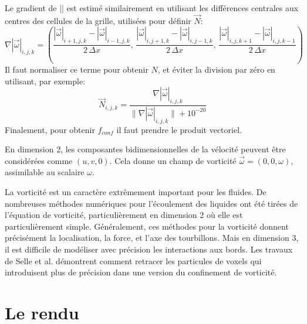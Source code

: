 \documentclass[11pt]{article}
\begin{document}
Le gradient de |\overrightarrow{\omega}| est estimé similairement en utilisant les différences centrales aux centres des cellules de la grille, utilisées pour définir $\overrightarrow{N}$:
\begin{equation}
\nabla |\overrightarrow{\omega}| _{i,j,k} = 
	\left(
		\frac{|\overrightarrow{\omega}|_{i+1,j,k} - |\overrightarrow{\omega}|_{i-1,j,k} }{2 \,\Delta x},\,
		\frac{|\overrightarrow{\omega}|_{i,j+1,k} - |\overrightarrow{\omega}|_{i,j-1,k} }{2 \,\Delta x},\,
		\frac{|\overrightarrow{\omega}|_{i,j,k+1} - |\overrightarrow{\omega}|_{i,j,k-1} }{2 \,\Delta x}
 	\right)
\end{equation}
Il faut normaliser ce terme pour obtenir $N$, et éviter la division par zéro en utilisant, par exemple:
\begin{equation}
\overrightarrow{N}_{i,j,k} = \frac{\nabla |\overrightarrow{\omega}|_{i,j,k}}{\| \nabla |\overrightarrow{\omega}|_{i,j,k} \| + 10^{-20}}
\end{equation}
Finalement, pour obtenir $f_{conf}$ il faut prendre le produit vectoriel. \newline

En dimension 2, les composantes bidimensionnelles de la vélocité peuvent être considérées comme $(u,v,0)$. Cela donne un champ de vorticité $\overrightarrow{\omega} = (0,0,\omega)$, assimilable au scalaire $\omega$. \newline

La vorticité est un caractère extrêmement important pour les fluides. De nombreuses méthodes numériques pour l'écoulement des liquides ont été tirées de l'équation de vorticité, particulièrement en dimension 2 où elle est particulièrement simple. Généralement, ces méthodes pour la vorticité donnent précisément la localisation, la force, et l'axe des tourbillons. Mais en dimension 3, il est difficile de modéliser avec précision les interactions aux bords. Les travaux de Selle et al. \cite{Selle-2005} démontrent comment retracer les particules de voxels qui introduisent plus de précision dans une version du confinement de vorticité.

\section{Le rendu}
\end{document}
